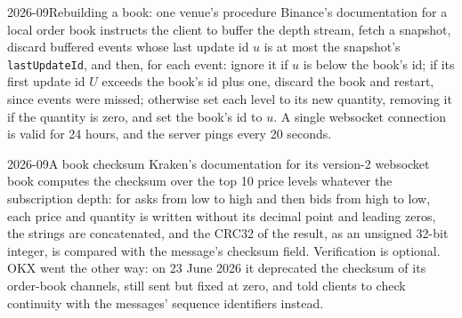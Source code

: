 \begin{dated}{2026-09}{Rebuilding a book: one venue's procedure}\label{dat:m3:crypto-data-and-infrastructure:binance}
Binance's documentation for a local order book instructs the client to buffer the depth stream, fetch a snapshot, discard buffered events
whose last update id $u$ is at most the snapshot's \texttt{lastUpdateId}, and then, for each event: ignore it if $u$ is below the book's id;
if its first update id $U$ exceeds the book's id plus one, discard the book and restart, since events were missed; otherwise set each level to
its new quantity, removing it if the quantity is zero, and set the book's id to $u$. A single websocket connection is valid for 24 hours, and the
server pings every 20 seconds.
\end{dated}

\begin{dated}{2026-09}{A book checksum}\label{dat:m3:crypto-data-and-infrastructure:kraken}
Kraken's documentation for its version-2 websocket book computes the checksum over the top 10 price levels whatever the subscription depth: for asks
from low to high and then bids from high to low, each price and quantity is written without its decimal point and leading zeros, the strings are
concatenated, and the CRC32 of the result, as an unsigned 32-bit integer, is compared with the message's checksum field. Verification is optional.
OKX went the other way: on 23 June 2026 it deprecated the checksum of its order-book channels, still sent but fixed at zero, and told clients to check
continuity with the messages' sequence identifiers instead.
\end{dated}

